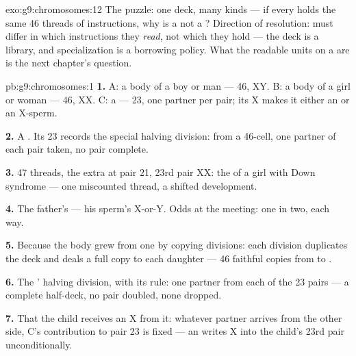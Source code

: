 \begin{solution}{exo:g9:chromosomes:12}
The puzzle: one deck, many  kinds --- if every 
holds the same 46 threads of instructions, why is a 
not a  ? Direction of resolution:  must
differ in which instructions they \emph{read}, not which
they hold --- the deck is a library, and specialization is
a borrowing policy. What the readable units on a
 are is the next chapter's question.
\end{solution}

\begin{solution}{pb:g9:chromosomes:1}
\textbf{1.} A: a body  of a boy or man --- 46, XY. B:
a body  of a girl or woman --- 46, XX. C: a  ---
23, one partner per pair; its X makes it either an  or an X-sperm.

\textbf{2.} A . Its 23 records the special halving
division: from a 46-cell, one partner of each pair taken,
no pair complete.

\textbf{3.} 47 threads, the extra at pair 21, 23rd pair
XX: the  of a girl with Down syndrome --- one
miscounted thread, a shifted development.

\textbf{4.} The father's --- his sperm's X-or-Y. Odds at
the meeting: one in two, each way.

\textbf{5.} Because the body grew from one  by
copying divisions: each division duplicates the deck and
deals a full copy to each daughter  --- 46 faithful
copies from  to .

\textbf{6.} The ' halving division, with its rule:
one partner from each of the 23 pairs --- a complete
half-deck, no pair doubled, none dropped.

\textbf{7.} That the child receives an X from it: whatever
partner arrives from the other side, C's contribution to
pair 23 is fixed --- an  writes X into the
child's 23rd pair unconditionally.


\end{solution}
